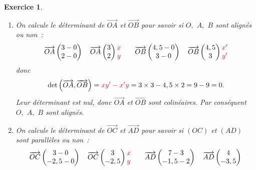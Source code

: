 \documentclass[10pt]{article}
\newtheorem{exo}{Exercice}
\begin{document}
\begin{exo}

\begin{enumerate}
\item On calcule le déterminant de $\overrightarrow{OA}$ et $\overrightarrow{OB}$ pour savoir si $O,$ $A,$ $B$ sont alignés ou non~:
\[\overrightarrow{OA}\begin{pmatrix} 3-0\\2-0 \end{pmatrix} \quad \overrightarrow{OA}\begin{pmatrix} 3\\2 \end{pmatrix}\begin{matrix} \textcolor{red}{
x}\\\textcolor{red}{
y} \end{matrix}\qquad
\overrightarrow{OB}\begin{pmatrix} 4,5-0\\3-0 \end{pmatrix}\quad \overrightarrow{OB}\begin{pmatrix} 4,5\\3 \end{pmatrix}\begin{matrix} \textcolor{red}{
x'}\\ \textcolor{red}{
y'}\end{matrix}\]
donc
\[\det\left(\overrightarrow{OA},\overrightarrow{OB}\right)=\textcolor{red}{
xy'-x'y}=3\times 3- 4,5\times 2=9-9=0.\] Leur déterminant est nul, donc $\overrightarrow{OA}$ et $\overrightarrow{OB}$ sont colinéaires. Par conséquent $O,$ $A,$ $B$ sont alignés.
\item On calcule le déterminant de $\overrightarrow{OC}$ et $\overrightarrow{AD}$ pour savoir si $(OC)$ et $(AD)$ sont parallèles ou non~:
\[\overrightarrow{OC}\begin{pmatrix} 3-0\\-2,5-0 \end{pmatrix}\quad \overrightarrow{OC}\begin{pmatrix} 3\\-2,5 \end{pmatrix}\begin{matrix} \textcolor{red}{
x}\\\textcolor{red}{
y} \end{matrix}\qquad
\overrightarrow{AD}\begin{pmatrix} 7-3\\-1,5-2 \end{pmatrix}\quad \overrightarrow{AD}\begin{pmatrix} 4\\-3,5 \end{pmatrix}\begin{matrix} \textcolor{red}{
}
\end{matrix}\]
\end{enumerate}
\end{exo}
\end{document}
